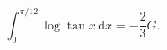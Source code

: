 %

\begin{problem}[pytanie 983044]
    \label{stack_983044}%
    \begin{equation}
        \int_0^{\pi/12} \log \tan x \,\mathrm{d} x = - \frac 2 3 G.
    \end{equation}
\end{problem}


%